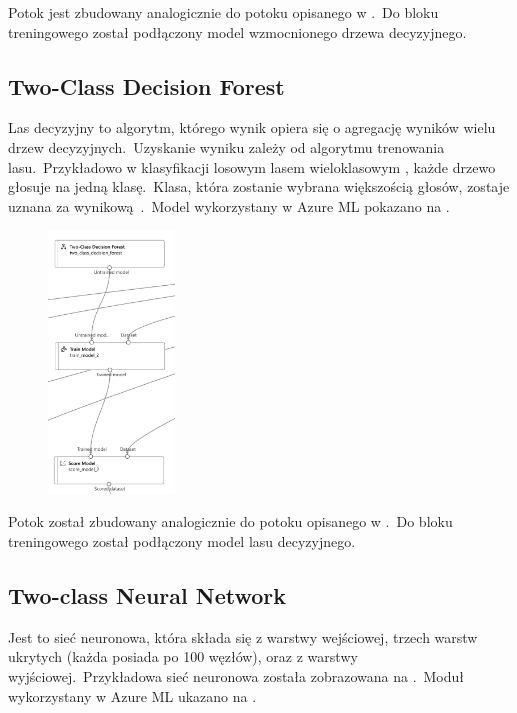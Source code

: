 Potok jest zbudowany analogicznie do potoku opisanego w .\ Do bloku treningowego został podłączony model wzmocnionego drzewa decyzyjnego.
\vfill
\pagebreak

\subsection{Two-Class Decision Forest}
Las decyzyjny to algorytm, którego wynik opiera się o agregację wyników wielu drzew decyzyjnych.\ Uzyskanie wyniku zależy od algorytmu trenowania lasu.\ Przykładowo w klasyfikacji losowym lasem wieloklasowym , każde drzewo głosuje na jedną klasę.\ Klasa, która zostanie wybrana większością głosów, zostaje uznana za wynikową~\cite{Google}.\ Model wykorzystany w Azure ML pokazano na .

\begin{figure}[H]
    \centering
    \includegraphics[width=0.3\textwidth]{images/df_pipe}
    \label{fig:df-pipe}
\end{figure}

Potok został zbudowany analogicznie do potoku opisanego w .\ Do bloku treningowego został podłączony model lasu decyzyjnego.

\subsection{Two-class Neural Network}
Jest to sieć neuronowa, która składa się z warstwy wejściowej, trzech warstw ukrytych (każda posiada po 100 węzłów), oraz z warstwy wyjściowej.\ Przykładowa sieć neuronowa została zobrazowana na .\ Moduł wykorzystany w Azure ML ukazano na .

